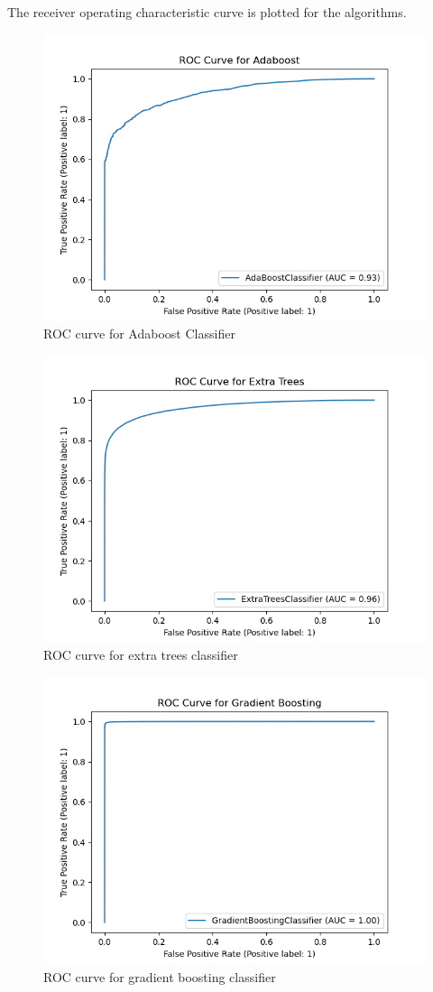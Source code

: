 \documentclass[twoside,11pt]{article}
\begin{document}
The receiver operating characteristic curve is plotted for the algorithms.

\begin{figure}[!ht]
  \centering
  \includegraphics[width=11.5cm]{./img/AdaboostROC.png}
  \caption{ROC curve for Adaboost Classifier}
\end{figure}
\begin{figure}[!ht]
  \centering
  \includegraphics[width=11.5cm]{./img/ExtraTreesROC.png}
  \caption{ROC curve for extra trees classifier}
\end{figure}
\begin{figure}[!ht]
  \centering
  \includegraphics[width=11.5cm]{./img/GradientBoostingROC.png}
  \caption{ROC curve for gradient boosting classifier}
\end{figure}
\end{document}
